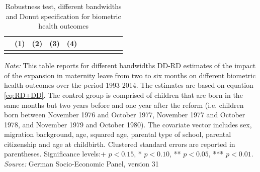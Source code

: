 \documentclass[a4paper ]{article}
\begin{document}
	
\begin{table}[p] \centering
\def\sym#1{\ifmmode^{#1}\else\(^{#1}\)\fi}
\caption{Robustness test, different bandwidths and Donut specification for biometric health outcomes}\label{tab:BMBW}
\begin{tabular}{l*{10}{c}}
\toprule
 &\multicolumn{1}{c}{(1)}&\multicolumn{1}{c}{(2)}&\multicolumn{1}{c}{(3)}&\multicolumn{1}{c}{(4)} \\ 
\midrule\\
	 
 \bottomrule
\end{tabular}
\begin{minipage}{0.9\textwidth} %
{\footnotesize \textit{Note:} 
This table reports for different bandwidths DD-RD estimates of the impact of the expansion in maternity leave from two to six months on different biometric health outcomes over the period 1993-2014. The estimates are based on equation \ref{eq:RD+DD}. The control group is comprised of children that are born in the same months but two years before and one year after the reform (i.e. children born between November 1976 and October 1977, November 1977 and October 1978, and November 1979 and October 1980). The covariate vector includes sex, migration background, age, squared age, parental type of school, parental citizenship and age at childbirth.\newline
Clustered standard errors are reported in parentheses. Significance levels:+ \(p<0.15\), * \(p<0.10\), ** \(p<0.05\), *** \(p<0.01\). \newline \textit{Source: }German Socio-Economic Panel, version 31\par}
\end{minipage}
\end{table}

\end{document}

